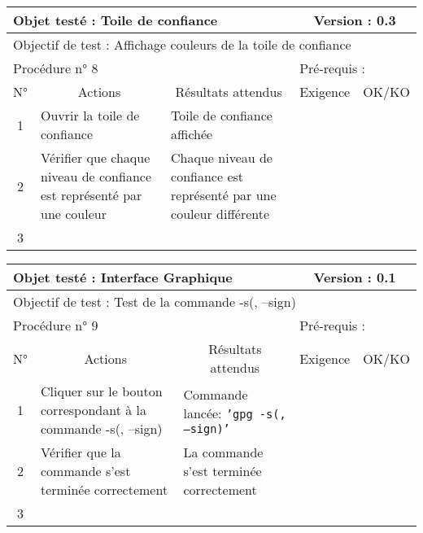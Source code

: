 \documentclass{../res/univ-projet}
\begin{document}
\begin{center}
    \begin{tabular}{|c|p{5cm}|p{5cm}|p{1.5cm}|p{1.5cm}|}
      \hline
      \multicolumn{3}{|l|}{Objet testé : Toile de confiance} & \multicolumn{2}{c|}{Version : 0.3}\\ \hline
      \multicolumn{5}{|l|}{Objectif de test : Affichage couleurs de la toile de confiance}\\ \hline
      \multicolumn{3}{|l|}{Procédure n° 8} & \multicolumn{2}{p{3cm}|}{Pré-requis : }\\ \hline
      \multicolumn{1}{|c|}{N°} & \multicolumn{1}{c|}{Actions} & \multicolumn{1}{c|}{Résultats attendus} & 
      \multicolumn{1}{c|}{Exigence} & \multicolumn{1}{c|}{OK/KO}\\ \hline
      1 & Ouvrir la toile de confiance & Toile de confiance affichée &  & \\
      2 & Vérifier que chaque niveau de confiance est représenté par une couleur & Chaque niveau de confiance est représenté par une couleur différente &  & \\
      3 &  &  &  & \\ \hline
    \end{tabular}
    \vskip 2.2cm

\begin{tabular}{|c|p{5cm}|p{5cm}|p{1.5cm}|p{1.5cm}|}
\hline
\multicolumn{3}{|l|}{Objet testé : Interface Graphique} & \multicolumn{2}{c|}{Version : 0.1}\\ \hline
\multicolumn{5}{|l|}{Objectif de test : Test de la commande -s(, –sign)}\\ \hline
\multicolumn{3}{|l|}{Procédure n° 9} & \multicolumn{2}{p{3cm}|}{Pré-requis : }\\ \hline
\multicolumn{1}{|c|}{N°} & \multicolumn{1}{c|}{Actions} & \multicolumn{1}{c|}{Résultats attendus} & 
\multicolumn{1}{c|}{Exigence} & \multicolumn{1}{c|}{OK/KO}\\ \hline
1 & Cliquer sur le bouton correspondant à la commande -s(, –sign) & Commande lancée: \texttt{'gpg -s(, –sign)'} &  & \\
2 & Vérifier que la commande s'est terminée correctement & La commande s'est terminée correctement &  & \\
3 &  &  &  & \\ \hline
\end{tabular}
\vskip 2.2cm



\end{center}
\end{document}
